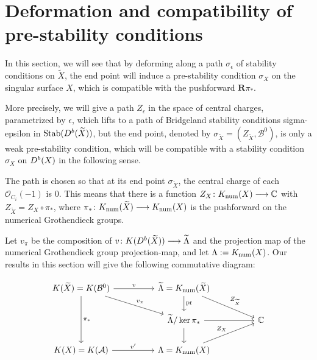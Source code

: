 \documentclass[12pt]{amsart}
\theoremstyle{definition}
\DeclareMathOperator{\num}{num}
\DeclareMathOperator{\Stab}{Stab}
\DeclareMathOperator{\pr}{pr}
\begin{document}
\section{Deformation and compatibility of pre-stability conditions}

In this section, we will see that by deforming along a path $\sigma_\epsilon$ of stability conditions on $\widetilde{X}$,
the end point will induce a pre-stability condition $\sigma_X$ on the singular surface $X$, which is compatible with the pushforward $\mathbf{R}\pi_\ast$.

More precisely, we will give a path $Z_\epsilon$ in the space of central charges, parametrized by $\epsilon$,
which lifts to a path of Bridgeland stability conditions  \gls{sigma-epsilon} in $\Stab({\rm D}^b(\widetilde{X}))$,
but the end point, denoted by $\sigma_{\widetilde{X}} = (Z_{\widetilde{X}},\mathcal{B}^0)$, is only a weak pre-stability condition,
which will be compatible with a stability condition $\sigma_X$ on ${\rm D}^b(X)$ in the following sense.

The path is chosen so that at its end point $\sigma_{\widetilde{X}}$, the central charge of each $\mathcal{O}_{C_i}(-1)$ is $0$.
This means that there is a function $Z_X \colon {\rm K}_{\num}(X) \longrightarrow \mathbb{C}$ with $Z_{\widetilde{X}} = Z_X \circ \pi_\ast$,
where $\pi_\ast \colon {\rm K}_{\num}(\widetilde{X}) \longrightarrow {\rm K}_{\num}(X)$ is the pushforward on the numerical Grothendieck groups.


Let $v_\pi$ be the composition of $v \colon {\rm K}({\rm D}^b(\widetilde{X})) \longrightarrow \widetilde{\Lambda}$ and the projection map of the numerical Grothendieck group \gls{projection-map}, and let $\Lambda:= {\rm K}_{\num}(X)$. 
Our results in this section will give the following commutative diagram:

\[
\begin{tikzcd}
{\rm K}(\widetilde{X}) ={\rm K}(\mathcal{B}^0) \arrow[rr, "v"] \arrow[dd, "\pi_\ast"] \arrow[rrd, "v_\pi"] &  & \widetilde{\Lambda}={\rm K}_{\num}(\widetilde{X}) \arrow[d, "\pr"] \arrow[rrd, "Z_{\widetilde{X}}"]        &  &            \\
&  & \widetilde{\Lambda}/\ker \pi_\ast \arrow[d] \arrow[rr] &  & \mathbb{C} \\
{\rm K}(X)= {\rm K}(\mathcal{A}) \arrow[rr, "v'"]                                                                  &  &  \Lambda={\rm K}_{\num}(X) \arrow[rru, "Z_X"]                                                          &  &           
\end{tikzcd}\]
\end{document}
